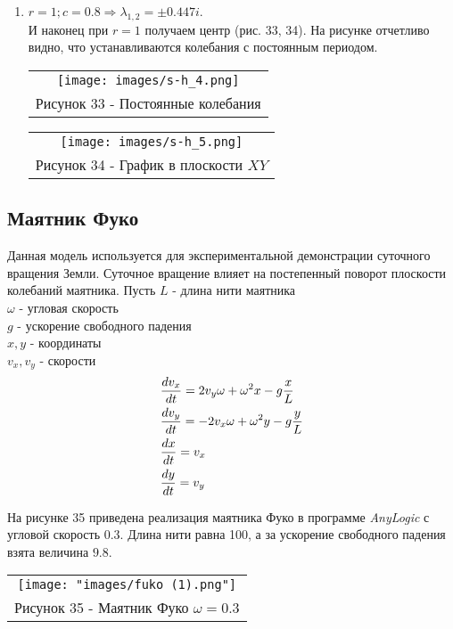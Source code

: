 \begin{enumerate}
  \item $r=1;c=0.8\Rightarrow \lambda_{1,2}=\pm 0.447 i$.\\ И наконец при $r=1$ получаем центр (рис. 33, 34). На рисунке отчетливо видно, что устанавливаются колебания с постоянным периодом.
  \begin{center}
    \begin{tabular}{c}
      \texttt{[image: images/s-h\_4.png]}\\
      Рисунок 33 - Постоянные колебания\\
      \end{tabular}
    \end{center}
    \begin{center}
      \begin{tabular}{c}
      \texttt{[image: images/s-h\_5.png]}\\
      Рисунок 34 - График в плоскости $XY$
    \end{tabular}
  \end{center}
\end{enumerate}
\subsection{Маятник Фуко}
Данная модель используется для экспериментальной демонстрации суточного вращения Земли. Суточное вращение влияет на постепенный поворот плоскости колебаний маятника.
Пусть $L$ - длина нити маятника\\
$\omega$ - угловая скорость\\
$g$ - ускорение свободного падения\\
$x,y$ - координаты\\
$v_x, v_y$ - скорости
\begin{align}
  &\dfrac{d v_x}{dt} = 2v_y\omega+\omega^2x-g\dfrac{x}{L}\notag\\
  &\dfrac{d v_y}{dt} = -2v_x\omega+\omega^2y-g\dfrac{y}{L}\\
  &\dfrac{d x}{dt} = v_x\notag\\
  &\dfrac{d y}{dt} = v_y\notag
\end{align}

На рисунке 35 приведена реализация маятника Фуко в программе \textit{AnyLogic} с угловой скорость 0.3. Длина нити равна 100, а за ускорение свободного падения взята величина $9.8$.
\begin{center}
  \begin{tabular}{c}
  \texttt{[image: "images/fuko (1).png"]}\\
  Рисунок 35 - Маятник Фуко $\omega=0.3$
\end{tabular}
\end{center}

